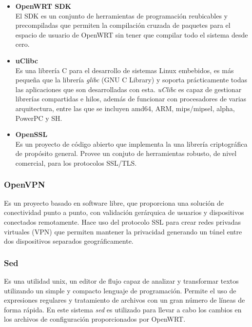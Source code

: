 \documentclass[12pt]{article}
\begin{document}
            \begin{itemize}
                \item \textbf{OpenWRT SDK} \\
                El SDK es un conjunto de herramientas de programación reubicables y precompiladas que permiten la compilación cruzada de paquetes para el espacio de usuario de OpenWRT sin tener que compilar todo el sistema desde cero.

                \item \textbf{uClibc} \\
                    Es una librería C para el desarrollo de sistemas Linux embebidos, es más pequeña que la librería \textit{glibc} (GNU C Library) y soporta prácticamente todas las aplicaciones que son desarrolladas con esta. \textit{uClibc} es capaz de gestionar librerías compartidas e hilos, además de funcionar con procesadores de varias arquitectura, entre las que se incluyen amd64, ARM, mips/mipsel, alpha, PowerPC y SH.

                \item \textbf{OpenSSL} \\
                    Es un proyecto de código abierto que implementa la una librería criptográfica de propósito general. Provee un conjuto de herramientas robusto, de nivel comercial, para los protocolos SSL/TLS.
            \end{itemize}
            
        \subsubsection{OpenVPN}
            Es un proyecto basado en software libre, que proporciona una solución de conectividad punto a punto, con validación gerárquica de usuarios y dispositivos conectados remotamente. Hace uso del protocolo SSL para crear redes privadas virtuales (VPN) que permiten mantener la privacidad generando un túnel entre dos dispositivos separados geográficamente.

        \subsubsection{Sed}
            Es una utilidad unix, un editor de flujo capaz de analizar y transformar textos utilizando un simple y compacto lenguaje de programación. Permite el uso de expresiones regulares y tratamiento de archivos con un gran número de líneas de forma rápida. En este sistema \textit{sed} es utilizado para llevar a cabo los cambios en los archivos de configuración proporcionados por OpenWRT.
\end{document}
